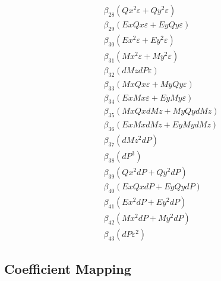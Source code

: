 \documentclass{article}
\begin{document}
\begin{align*}
&\quad \beta_{28} \left(Qx^{2} ε + Qy^{2} ε\right) \\
&\quad \beta_{29} \left(Ex Qx ε + Ey Qy ε\right) \\
&\quad \beta_{30} \left(Ex^{2} ε + Ey^{2} ε\right) \\
&\quad \beta_{31} \left(Mx^{2} ε + My^{2} ε\right) \\
&\quad \beta_{32} \left(dMz dP ε\right) \\
&\quad \beta_{33} \left(Mx Qx ε + My Qy ε\right) \\
&\quad \beta_{34} \left(Ex Mx ε + Ey My ε\right) \\
&\quad \beta_{35} \left(Mx Qx dMz + My Qy dMz\right) \\
&\quad \beta_{36} \left(Ex Mx dMz + Ey My dMz\right) \\
&\quad \beta_{37} \left(dMz^{2} dP\right) \\
&\quad \beta_{38} \left(dP^{3}\right) \\
&\quad \beta_{39} \left(Qx^{2} dP + Qy^{2} dP\right) \\
&\quad \beta_{40} \left(Ex Qx dP + Ey Qy dP\right) \\
&\quad \beta_{41} \left(Ex^{2} dP + Ey^{2} dP\right) \\
&\quad \beta_{42} \left(Mx^{2} dP + My^{2} dP\right) \\
&\quad \beta_{43} \left(dP ε^{2}\right)
\end{align*}

\subsection*{Coefficient Mapping}
\end{document}
